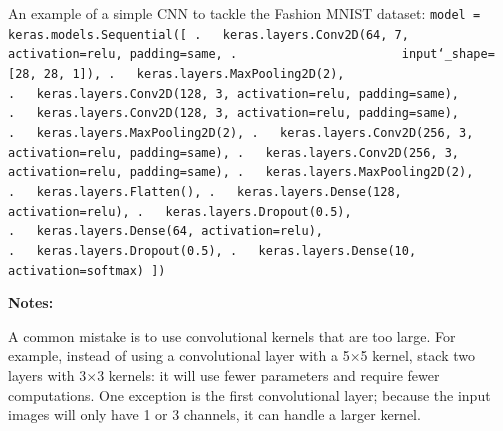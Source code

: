 An example of a simple CNN to tackle the Fashion MNIST dataset:\newline
% 
\texttt{model = keras.models.Sequential([\newline
.~~~keras.layers.Conv2D(64, 7, activation=\textquotesingle relu\textquotesingle, padding=\textquotesingle same\textquotesingle,\newline
.~~~~~~~~~~~~~~~~~~~~~~~input\char`_shape=[28, 28, 1]),\newline
.~~~keras.layers.MaxPooling2D(2),\newline
.~~~keras.layers.Conv2D(128, 3, activation=\textquotesingle relu\textquotesingle, padding=\textquotesingle same\textquotesingle),\newline
.~~~keras.layers.Conv2D(128, 3, activation=\textquotesingle relu\textquotesingle, padding=\textquotesingle same\textquotesingle),\newline
.~~~keras.layers.MaxPooling2D(2),\newline
.~~~keras.layers.Conv2D(256, 3, activation=\textquotesingle relu\textquotesingle, padding=\textquotesingle same\textquotesingle),\newline
.~~~keras.layers.Conv2D(256, 3, activation=\textquotesingle relu\textquotesingle, padding=\textquotesingle same\textquotesingle),\newline
.~~~keras.layers.MaxPooling2D(2),\newline
.~~~keras.layers.Flatten(),\newline
.~~~keras.layers.Dense(128, activation=\textquotesingle relu\textquotesingle),\newline
.~~~keras.layers.Dropout(0.5),\newline
.~~~keras.layers.Dense(64, activation=\textquotesingle relu\textquotesingle),\newline
.~~~keras.layers.Dropout(0.5),\newline
.~~~keras.layers.Dense(10, activation=\textquotesingle softmax\textquotesingle)\newline
])}\newline

\textbf{Notes:}

A common mistake is to use convolutional kernels that are too large.
For example, instead of using a convolutional layer with a 5$\times$5 kernel,
stack two layers with 3$\times$3 kernels:
it will use fewer parameters and require fewer computations.
One exception is the first convolutional layer;
because the input images will only have 1 or 3 channels,
it can handle a larger kernel.

